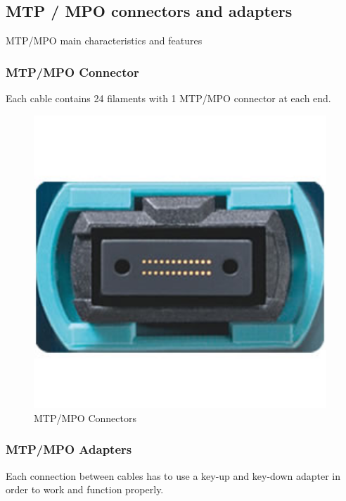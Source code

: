 \subsection{MTP / MPO connectors and adapters}

  MTP/MPO main characteristics and features

\subsubsection{MTP/MPO Connector}

  Each cable contains 24 filaments with 1 MTP/MPO connector at each end.

\begin{figure}
  \includegraphics[width=11cm]{images/3.jpg}
  \centering
  \caption{MTP/MPO Connectors}
  \label{fig:jlsimon}
\end{figure}

\subsubsection{MTP/MPO Adapters}

  Each connection between cables has to use a key-up and key-down adapter in order to work and function properly.

